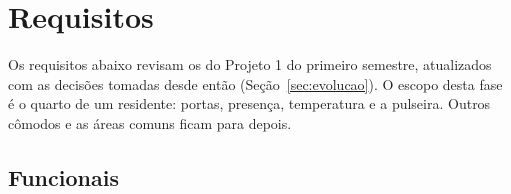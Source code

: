 \section{Requisitos}\label{sec:requisitos}
Os requisitos abaixo revisam os do Projeto 1 do primeiro semestre, atualizados com as
decisões tomadas desde então (Seção~\ref{sec:evolucao}). O escopo desta fase é o quarto de
um residente: portas, presença, temperatura e a pulseira. Outros cômodos e as áreas comuns
ficam para depois.

\subsection{Funcionais}

